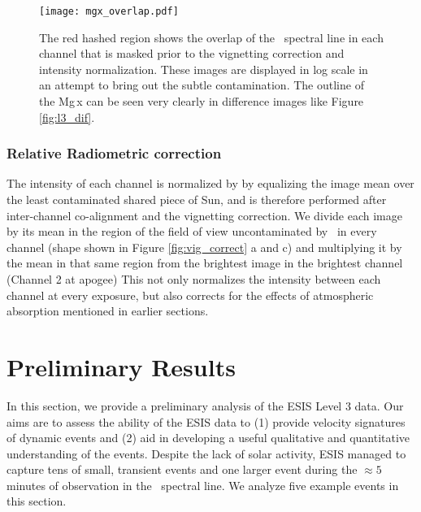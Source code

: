   
        
        \begin{figure}[htb!]
        	\centering
        	\texttt{[image: mgx\_overlap.pdf]}
        	\caption{The red hashed region shows the overlap of the \mgxbright \ spectral line in each channel that is masked prior to the vignetting correction and intensity normalization. These images are displayed in log scale in an attempt to bring out the subtle contamination.  The outline of the Mg\,{\sc x} can be seen very clearly in difference images like Figure \ref{fig:l3_dif}. }

        	\label{fig:mgx_overlap}
        \end{figure}
        
        

        
    \subsubsection{Relative Radiometric correction }
        The intensity of each channel is normalized by by equalizing the image mean over the least contaminated shared piece of Sun, and is therefore performed after inter-channel co-alignment and the vignetting correction.
        We divide each image by its mean in the region of the field of view uncontaminated by \mgxbright \ in every channel (shape shown in Figure \ref{fig:vig_correct} a and c) and multiplying it by the mean in that same region from the brightest image in the brightest channel (Channel 2 at apogee)
        This not only normalizes the intensity between each channel at every exposure, but also corrects for the effects of atmospheric absorption mentioned in earlier sections. 


\section{Preliminary Results}
 
	   In this section, we provide a preliminary analysis of the ESIS Level 3 data. Our aims are to assess the ability of the ESIS data to (1) provide velocity signatures of dynamic events and (2) aid in developing a useful qualitative and quantitative understanding of the events.
	   Despite the lack of solar activity, ESIS managed to capture tens of small, transient events and one larger event during the $\approx 5$ minutes of observation in the \ov \ spectral line.  
	   We analyze five example events in this section.  
	   
